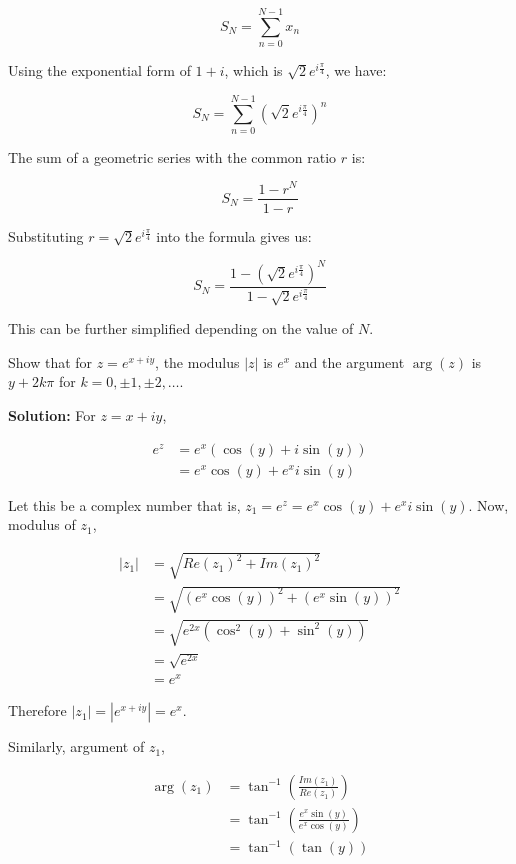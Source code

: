\[ S_N = \sum_{n=0}^{N-1} x_n \]

Using the exponential form of \( 1 + i \), which is \( \sqrt{2}e^{i\frac{\pi}{4}} \), we have:

\[ S_N = \sum_{n=0}^{N-1} \left(\sqrt{2}e^{i\frac{\pi}{4}}\right)^n \]

The sum of a geometric series with the common ratio \( r \) is:

\[ S_N = \frac{1 - r^N}{1 - r} \]

Substituting \( r = \sqrt{2}e^{i\frac{\pi}{4}} \) into the formula gives us:

\[ S_N = \frac{1 - \left(\sqrt{2}e^{i\frac{\pi}{4}}\right)^N}{1 - \sqrt{2}e^{i\frac{\pi}{4}}} \]

This can be further simplified depending on the value of \( N \).

\begin{exercise}
    Show that for \( z = e^{x+iy} \), the modulus \( |z| \) is \( e^x \) and the argument \( \arg(z) \) is \( y + 2k\pi \) for \( k = 0, \pm 1, \pm 2, \ldots \).
\end{exercise}
\textbf{Solution:}
For \( z = x + iy \),

\begin{align*}
e^{z} &= e^{x}(\cos(y) + i\sin(y)) \\
&= e^{x}\cos(y) + e^{x}i\sin(y)
\end{align*}

Let this be a complex number that is, \( z_1 = e^{z} = e^{x}\cos(y) + e^{x}i\sin(y) \). Now, modulus of \( z_1 \),

\begin{align*}
|z_1| &= \sqrt{Re(z_1)^2 + Im(z_1)^2} \\
&= \sqrt{(e^{x}\cos(y))^2 + (e^{x}\sin(y))^2} \\
&= \sqrt{e^{2x}(\cos^2(y) + \sin^2(y))} \\
&= \sqrt{e^{2x}} \\
&= e^{x}
\end{align*}

Therefore \( |z_1| = |e^{x+iy}| = e^{x} \).

Similarly, argument of \( z_1 \),

\begin{align*}
\arg(z_1) &= \tan^{-1}\left(\frac{Im(z_1)}{Re(z_1)}\right) \\
&= \tan^{-1}\left(\frac{e^{x}\sin(y)}{e^{x}\cos(y)}\right) \\
&= \tan^{-1}(\tan(y))
\end{align*}

